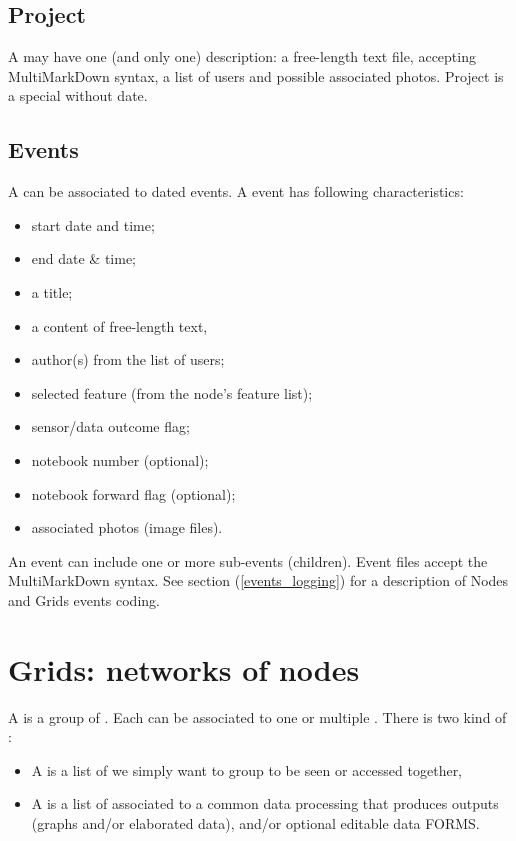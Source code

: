 \subsection{Project}

A  may have one (and only one)  description: a free-length text file, accepting MultiMarkDown syntax, a list of users and possible associated photos. Project is a special  without date.

\subsection{Events}

A  can be associated to dated events. A  event has following characteristics:
\begin{itemize}
	\item start date and time;
	\item end date \& time;
	\item a title;
	\item a content of free-length text,
	\item author(s) from the list of \webobs users;
	\item selected feature (from the node's feature list);
	\item sensor/data outcome flag;
	\item notebook number (optional);
	\item notebook forward flag (optional);
	\item associated photos (image files).
\end{itemize}
An event can include one or more sub-events (children). Event files  accept the MultiMarkDown syntax. See  section (\ref{events_logging}) for a description of Nodes and Grids events coding.


\section{Grids: networks of nodes}
\label{grids}

A  is a group of . Each  can be associated to one or multiple . There is two kind of :

\begin{itemize}
\item    A  is a list of  we simply want to group to be seen or accessed together,
\item    A  is a list of  associated to a common data processing that produces outputs (graphs and/or elaborated data), and/or optional editable data FORMS.
\end{itemize}

